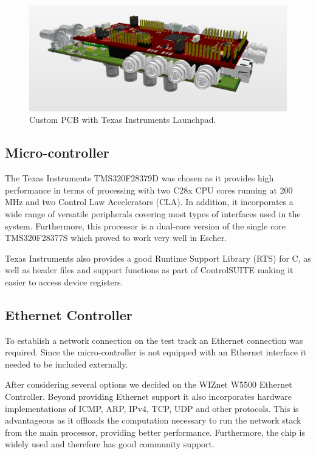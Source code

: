 \begin{figure}[H]
  \centering \includegraphics[width=1.0\textwidth]{./figures/pcb.png}
  \caption{Custom PCB with Texas Instruments Launchpad.}
\end{figure}

\subsection{Micro-controller}

The Texas Instruments TMS320F28379D was chosen as it provides high performance in terms of processing with two C28x CPU cores running at 200 MHz and two Control Law Accelerators (CLA). In addition, it incorporates a wide range of versatile peripherals covering most types of interfaces used in the system. Furthermore, this processor is a dual-core version of the single core TMS320F28377S which proved to work very well in Escher.

Texas Instruments also provides a good Runtime Support Library (RTS) for C, as well as header files and support functions as part of ControlSUITE\cite{controlsuite} making it easier to access device registers.

\subsection{Ethernet Controller}

To establish a network connection on the test track an Ethernet connection was required. Since the micro-controller is not equipped with an Ethernet interface it needed to be included externally.

After considering several options we decided on the WIZnet W5500 Ethernet Controller. Beyond providing Ethernet support it also incorporates hardware implementations of ICMP, ARP, IPv4, TCP, UDP and other protocols. This is advantageous as it offloads the computation necessary to run the network stack from the main processor, providing better performance. Furthermore, the chip is widely used and therefore has good community support.

